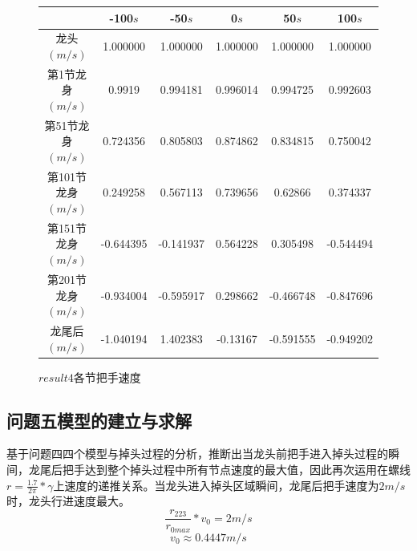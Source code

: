 \documentclass[withoutpreface,bwprint]{cumcmthesis}
\begin{document}
\begin{figure}
	\centering
	\begin{tabular}{|c|c|c|c|c|c|}
		\hline
		& -100$s$ & -50$s$ & 0$s$ & 50$s$ & 100$s$ \\ \hline
		龙头$(m/s)$ & 1.000000 & 1.000000 & 1.000000 & 1.000000 & 1.000000 \\ \hline
		第1节龙身$(m/s)$ & 0.9919 & 0.994181 & 0.996014 & 0.994725 & 0.992603  \\ \hline
		第51节龙身$(m/s)$ & 0.724356 & 0.805803 & 0.874862 & 0.834815 & 0.750042 \\ \hline
		第101节龙身$(m/s)$ & 0.249258 & 0.567113 & 0.739656 & 0.62866 & 0.374337 \\ \hline
		第151节龙身$(m/s)$ & -0.644395 & -0.141937 & 0.564228 & 0.305498 & -0.544494  \\ \hline
		第201节龙身$(m/s)$ & -0.934004 & -0.595917 & 0.298662 & -0.466748 & -0.847696  \\ \hline
		龙尾后$(m/s)$ & -1.040194 & 1.402383 & -0.13167 & -0.591555 & -0.949202  \\ \hline
	\end{tabular}
	\caption{$result4$各节把手速度}   
	\label{fig:result42}         
\end{figure}


\newpage
\subsection{问题五模型的建立与求解}
基于问题四四个模型与掉头过程的分析，推断出当龙头前把手进入掉头过程的瞬间，龙尾后把手达到整个掉头过程中所有节点速度的最大值，因此再次运用在螺线$r=\frac{1.7}{2\pi}*\gamma$上速度的递推关系。当龙头进入掉头区域瞬间，龙尾后把手速度为$2m/s$时，龙头行进速度最大。
$$\frac{r_{223}}{r_{0max}}*v_0 = 2m/s$$$$v_0\approx 0.4447m/s$$
\end{document}
